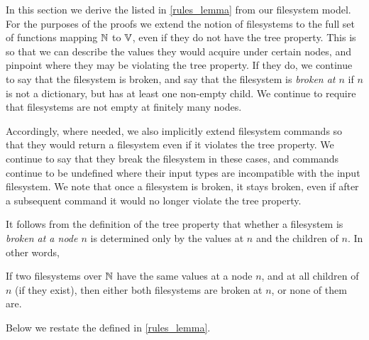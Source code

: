 
In this section we derive the  listed in
\cref{rules_lemma} from our filesystem model.
For the purposes of the proofs we extend the notion of filesystems %
to the full set of functions mapping $\mathbb{N}$ to $\mathbb{V}$, even if they
do not have the tree property.
This is so that we can describe the values they would acquire under certain nodes,
and pinpoint where they may be violating the tree property.
If they do, we continue to say that the filesystem is broken,
and say that the filesystem is \emph{broken at $n$} if 
$n$ is not a dictionary, but has at least one non-empty child.
We continue to require that filesystems are not empty at finitely many nodes.

Accordingly, where needed, we also implicitly extend filesystem commands
so that they would return a filesystem even if it violates the tree property.
We continue to say that they break the filesystem in these cases,
and commands continue to be undefined where their input types are incompatible
with the input filesystem.
We note that once a filesystem is broken, it stays broken, even if
after a subsequent command it would no longer violate the tree property.

It follows from the definition of the tree property that
whether a filesystem is \emph{broken at a node $n$} is determined only
by the values at $n$ and the children of $n$.
In other words,

\begin{myclm}
If two filesystems over $\mathbb{N}$ have the same values at a node $n$,
and at all children of $n$ (if they exist),
then either both filesystems are broken at $n$, or none of them are.
\end{myclm}

Below we restate the  defined in
\cref{rules_lemma}.

\begin{myaxproof}
\axaxseparatecommute
\end{myaxproof}

